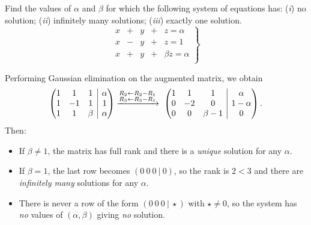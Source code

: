 \documentclass[11pt]{exam}
\newcommand{\BAR}{%
    \hspace{-\arraycolsep}%
    \strut\vrule %
    \hspace{-\arraycolsep}%
}
\begin{document}
\begin{questions}
\begin{solution}
\begin{enumerate}[leftmargin=0.55cm, label=(\alph*), rightmargin=0.2cm]
\end{enumerate}
\end{solution}



\question[2]
    Find the values of $\alpha$ and $\beta$ for which the following system of equations has: (\textit{i}) no solution; (\textit{ii}) infinitely many solutions; (\textit{iii}) exactly one solution.
    \begin{equation*}
        \left.
        \begin{alignedat}{4}
             x & {}+{} & y & {}+{} & z = \alpha \\
             x & {}-{} & y & {}+{} & z = 1 \\
             x & {}+{} & y & {}+{} & \beta z = \alpha \\
        \end{alignedat}
        \right\}
    \end{equation*}

\begin{solution}[0cm]
    Performing Gaussian elimination on the augmented matrix, we obtain
    \[
    \begin{pmatrix}
    1 & 1 & 1 & \BAR & \alpha \\
    1 & -1 & 1 & \BAR & 1 \\
    1 & 1 & \beta & \BAR & \alpha
    \end{pmatrix}
    \xrightarrow{\substack{R_2\leftarrow R_2-R_1 \\ R_3\leftarrow R_3-R_1}}\
    \begin{pmatrix}
    1 & 1 & 1 & \BAR & \alpha \\
    0 & -2 & 0 & \BAR & 1-\alpha \\
    0 & 0 & \beta-1 & \BAR & 0
    \end{pmatrix}.
    \]
    Then:
    \begin{itemize}
        \item[$\bullet$] If $\beta \neq 1$, the matrix has full rank and there is a \emph{unique} solution for any $\alpha$.
        \item[$\bullet$] If $\beta = 1$, the last row becomes $(0\ 0\ 0\ |\ 0)$, so the rank is $2 < 3$ and there are \emph{infinitely many} solutions for any $\alpha$.
        \item[$\bullet$] There is never a row of the form $(0\ 0\ 0\ |\ \star)$ with $\star \neq 0$, so the system has \emph{no} values of $(\alpha,\beta)$ giving \emph{no} solution. 
    \end{itemize}
\end{solution}


\end{questions}
\end{document}
